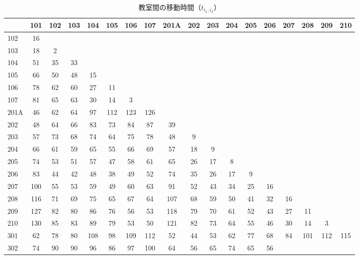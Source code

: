 \begin{table}[htbp]
 \begin{center}
\caption{教室間の移動時間（$t_{i_1,i_2}$）}
\label{paramt}
  {\tiny
  \begin{tabular}{lccccccccccccccccc}
%
\hline
 & 101 & 102 & 103 & 104 & 105 & 106 & 107 & 201A
   & 202 & 203 & 204 & 205 & 206 & 207 & 208 &
   209 & 210 \\
\hline
102 & 16 &  &  &  &  &  &  &  &  &  &  &  &  &  &  &  &  \\
103 & 18 & 2 &  &  &  &  &  &  &  &  &  &  &  &  &  &  &  \\
104 & 51 & 35 & 33 &  &  &  &  &  &  &  &  &  &  &  &  &  &  \\
105 & 66 & 50 & 48 & 15 &  &  &  &  &  &  &  &  &  &  &  &  &  \\
106 & 78 & 62 & 60 & 27 & 11 &  &  &  &  &  &  &  &  &  &  &  &  \\
107 & 81 & 65 & 63 & 30 & 14 & 3 &  &  &  &  &  &  &  &  &  &  &  \\
201A & 46 & 62 & 64 & 97 & 112 & 123 & 126 &  &  &  &  &  &  &  &  &
								   &  \\
202 & 48 & 64 & 66 & 83 & 73 & 84 & 87 & 39 &  &  &  &  &  &  &  &  &  \\
203 & 57 & 73 & 68 & 74 & 64 & 75 & 78 & 48 & 9 &  &  &  &  &  &  &
								   &  \\
204 & 66 & 61 & 59 & 65 & 55 & 66 & 69 & 57 & 18 & 9 &  &  &  &  &  &
								   &  \\
205 & 74 & 53 & 51 & 57 & 47 & 58 & 61 & 65 & 26 & 17 & 8 &  &  &  &
							       &  &  \\
206 & 83 & 44 & 42 & 48 & 38 & 49 & 52 & 74 & 35 & 26 & 17 & 9 &  &
							   &  &  &  \\
207 & 100 & 55 & 53 & 59 & 49 & 60 & 63 & 91 & 52 & 43 & 34 & 25 & 16
						       &  &  &  &  \\
208 & 116 & 71 & 69 & 75 & 65 & 67 & 64 & 107 & 68 & 59 & 50 & 41 &
						       32 & 16 &  &  &  \\
209 & 127 & 82 & 80 & 86 & 76 & 56 & 53 & 118 & 79 & 70 & 61 & 52 &
						       43 & 27 & 11 &  &  \\
210 & 130 & 85 & 83 & 89 & 79 & 53 & 50 & 121 & 82 & 73 & 64 & 55 &
						       46 & 30 & 14 & 3
								   &  \\
301 & 62 & 78 & 80 & 108 & 98 & 109 & 112 & 52 & 44 & 53 & 62 & 77 &
						       68 & 84 & 101 &
								   112 &
								       115 \\
302 & 74 & 90 & 90 & 96 & 86 & 97 & 100 & 64 & 56 & 65 & 74 & 65 & 56

\end{tabular}}
\end{center}
\end{table}
